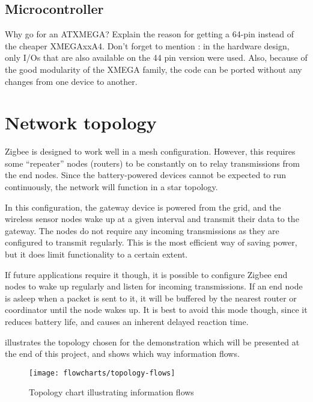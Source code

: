 \subsection{Microcontroller}
Why go for an ATXMEGA?
Explain the reason for getting a 64-pin instead of the cheaper XMEGAxxA4.
Don't forget to mention : in the hardware design, only I/Os that are also
available on the 44 pin version were used. Also, because of the good modularity
of the XMEGA family, the code can be ported without any changes from one device
to another.


\section{Network topology}

Zigbee is designed to work well in a mesh configuration. However, this requires
some ``repeater'' nodes (routers) to be constantly on to relay transmissions
from the end nodes. Since the battery-powered devices cannot be expected to run
continuously, the network will function in a star topology.

In this configuration, the gateway device is powered from the grid, and the
wireless sensor nodes wake up at a given interval and transmit their data to the
gateway. The nodes do not require any incoming transmissions as they are
configured to transmit regularly. This is the most efficient way of saving
power, but it does limit functionality to a certain extent.

If future applications require it though, it is possible to configure Zigbee end
nodes to wake up regularly and listen for incoming transmissions. If an end node
is asleep when a packet is sent to it, it will be buffered by the nearest router
or coordinator until the node wakes up. It is best to avoid this mode though,
since it reduces battery life, and causes an inherent delayed reaction time.

 illustrates the topology chosen for the demonstration
which will be presented at the end of this project, and shows which way
information flows. 


\begin{figure}[h]
  \begin{center}
    \texttt{[image: flowcharts/topology-flows]}
  \end{center}
  \caption{Topology chart illustrating information flows}
  \label{fig:topology-flows}
\end{figure}

